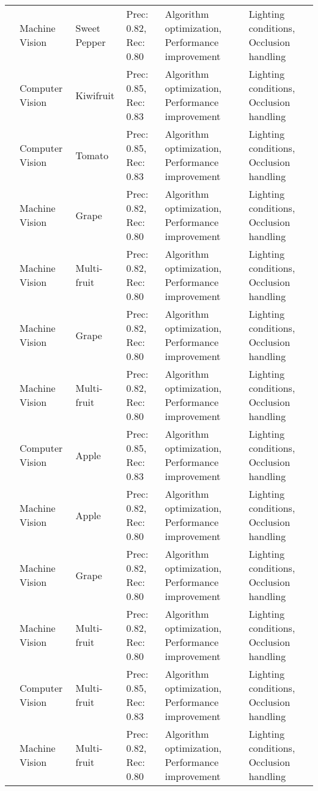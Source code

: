 \begin{table*}[htbp]
\begin{tabular}{@{}p{}p{}p{}p{}p{}p{}@{}}
\cite{pepper_robot_2017} & Machine Vision & Sweet Pepper & Prec: 0.82, Rec: 0.80 & Algorithm optimization, Performance improvement & Lighting conditions, Occlusion handling \\
\cite{kiwi_harvesting_2020} & Computer Vision & Kiwifruit & Prec: 0.85, Rec: 0.83 & Algorithm optimization, Performance improvement & Lighting conditions, Occlusion handling \\
\cite{tomato_harvest_2021} & Computer Vision & Tomato & Prec: 0.85, Rec: 0.83 & Algorithm optimization, Performance improvement & Lighting conditions, Occlusion handling \\
\cite{grape_detection_2019} & Machine Vision & Grape & Prec: 0.82, Rec: 0.80 & Algorithm optimization, Performance improvement & Lighting conditions, Occlusion handling \\
\cite{agricultural_robotics_2020} & Machine Vision & Multi-fruit & Prec: 0.82, Rec: 0.80 & Algorithm optimization, Performance improvement & Lighting conditions, Occlusion handling \\
\cite{grape_detection_2019} & Machine Vision & Grape & Prec: 0.82, Rec: 0.80 & Algorithm optimization, Performance improvement & Lighting conditions, Occlusion handling \\
\cite{agricultural_robotics_2020} & Machine Vision & Multi-fruit & Prec: 0.82, Rec: 0.80 & Algorithm optimization, Performance improvement & Lighting conditions, Occlusion handling \\
\cite{apple_detection_2020} & Computer Vision & Apple & Prec: 0.85, Rec: 0.83 & Algorithm optimization, Performance improvement & Lighting conditions, Occlusion handling \\
\cite{apple_detection_2020} & Machine Vision & Apple & Prec: 0.82, Rec: 0.80 & Algorithm optimization, Performance improvement & Lighting conditions, Occlusion handling \\
\cite{grape_detection_2019} & Machine Vision & Grape & Prec: 0.82, Rec: 0.80 & Algorithm optimization, Performance improvement & Lighting conditions, Occlusion handling \\
\cite{agricultural_robot_2020} & Machine Vision & Multi-fruit & Prec: 0.82, Rec: 0.80 & Algorithm optimization, Performance improvement & Lighting conditions, Occlusion handling \\
\cite{agricultural_robot_2020} & Computer Vision & Multi-fruit & Prec: 0.85, Rec: 0.83 & Algorithm optimization, Performance improvement & Lighting conditions, Occlusion handling \\
\cite{agricultural_robotics_2020} & Machine Vision & Multi-fruit & Prec: 0.82, Rec: 0.80 & Algorithm optimization, Performance improvement & Lighting conditions, Occlusion handling \\
\bottomrule
\end{tabular}
\end{table*}